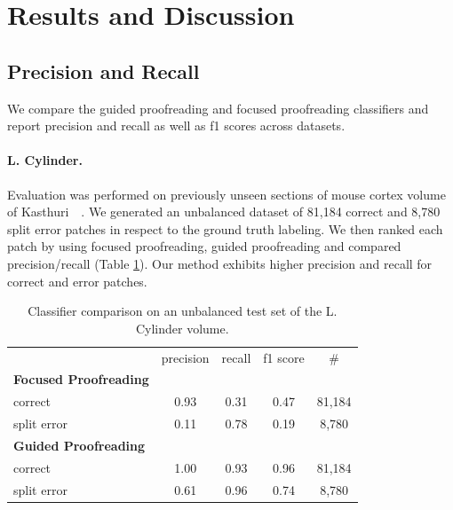 



\section{Results and Discussion}


\subsection{Precision and Recall}

We compare the guided proofreading and focused proofreading classifiers and report precision and recall as well as f1 scores across datasets.

\paragraph{L. Cylinder.} Evaluation was performed on previously unseen sections of mouse cortex volume of Kasthuri~\etal~\cite{kasthuri2015saturated}. We generated an unbalanced dataset of 81,184 correct and 8,780 split error patches in respect to the ground truth labeling. We then ranked each patch by using focused proofreading, guided proofreading and compared precision/recall (Table \ref{tab:prcyl}). Our method exhibits higher precision and recall for correct and error patches.

\begin{table}[h]
\caption{Classifier comparison on an unbalanced test set of the L. Cylinder volume.}%

\small{
\begin{tabular}{l|c|c|c|c}

 & precision & recall & f1 score & \# \\ 
\textbf{Focused Proofreading} & ~ & ~ & ~ & ~ \\ 
correct & 0.93 & 0.31 & 0.47 & 81,184 \\ 
split error & 0.11 & 0.78 & 0.19 & 8,780 \\ 
\textbf{Guided Proofreading} & ~ & ~ & ~ & ~ \\ 
correct & 1.00 & 0.93 & 0.96 & 81,184 \\ 
split error & 0.61 & 0.96 & 0.74 & 8,780 \\ 
\end{tabular} 
}
\label{tab:prcyl}
\end{table}

